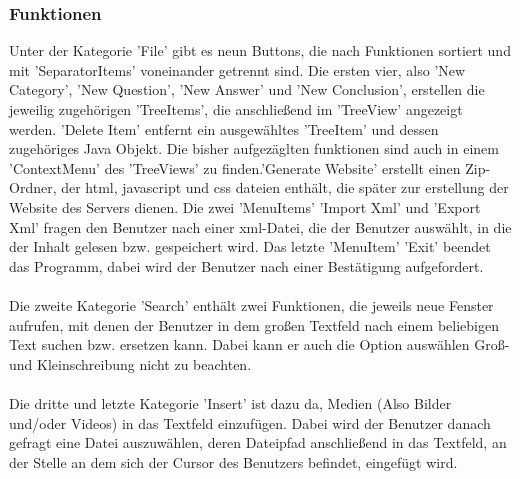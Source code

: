 \subsubsection*{Funktionen}
Unter der Kategorie 'File' gibt es neun Buttons, die nach Funktionen sortiert und mit 'SeparatorItems' voneinander getrennt sind. Die ersten vier, also 'New Category', 'New Question', 'New Answer' und 'New Conclusion', erstellen die jeweilig zugehörigen 'TreeItems', die anschließend im 'TreeView' angezeigt werden. 'Delete Item' entfernt ein ausgewähltes 'TreeItem' und dessen zugehöriges Java Objekt. Die bisher aufgezäglten funktionen sind auch in einem 'ContextMenu' des 'TreeViews' zu finden.'Generate Website' erstellt einen Zip-Ordner, der html, javascript und css dateien enthält, die später zur erstellung der Website des Servers dienen.  Die zwei 'MenuItems' 'Import Xml' und 'Export Xml' fragen den Benutzer nach einer xml-Datei, die der Benutzer auswählt, in die der Inhalt gelesen bzw. gespeichert wird. Das letzte 'MenuItem' 'Exit'  beendet das Programm, dabei wird der Benutzer nach einer Bestätigung aufgefordert.
\\
\\
Die zweite Kategorie 'Search' enthält zwei Funktionen, die jeweils neue Fenster aufrufen, mit denen der Benutzer in dem großen Textfeld nach einem beliebigen Text suchen bzw. ersetzen kann. Dabei kann er auch die Option auswählen Groß- und Kleinschreibung nicht zu beachten. 
\\
\\
Die dritte und letzte Kategorie 'Insert' ist dazu da, Medien (Also Bilder und/oder Videos) in das Textfeld einzufügen. Dabei wird der Benutzer danach gefragt eine Datei auszuwählen, deren Dateipfad anschließend in das Textfeld, an der Stelle an dem sich der Cursor des Benutzers befindet, eingefügt wird. 
\\
\\
